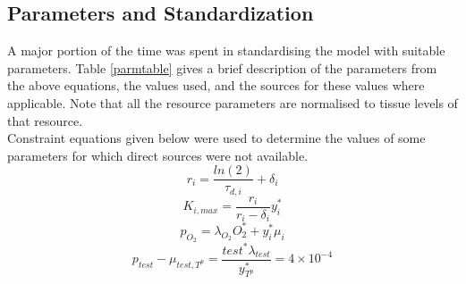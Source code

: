 \documentclass[11pt,a4paper]{article}
\begin{document}
\subsection{Parameters and Standardization}
A major portion of the time was spent in standardising the model with suitable parameters. Table \ref{parmtable} gives a brief description of the parameters from the above equations, the values used, and the sources for these values where applicable. Note that all the resource parameters are normalised to tissue levels of that resource.\\
Constraint equations given below were used to determine the values of some parameters for which direct sources were not available.
\begin{equation}
  r_i = \frac{ln(2)}{\tau_{d,i}} + \delta_i
  \label{r_eq}
\end{equation}
\begin{equation}
  K_{i,max}=\frac{r_i}{r_i-\delta_i} y_i^*
  \label{rho_eq}
\end{equation}
\begin{equation}
  p_{O_2} = \lambda_{O_2} O_2^* + y_i^* \mu_i
  \label{p_o2_eq}
\end{equation}
\begin{equation}
  p_{test} - \mu_{test,T^p} = \frac{test^* \lambda_{test}}{y_{T^p}^*} = 4 \times 10^{-4}
  \label{p_test_eq}
\end{equation}
\end{document}
